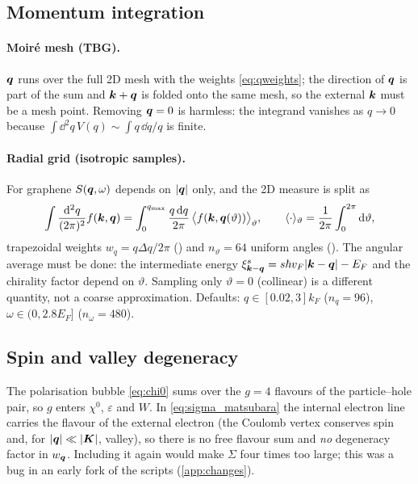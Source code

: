 \subsection{Momentum integration}
\label{sec:radial}

\paragraph{Moir\'e mesh (TBG).} $\bm q$ runs over the full 2D mesh with the weights \eqref{eq:qweights}; the
direction of $\bm q$ is part of the sum and $\bm k+\bm q$ is folded onto the same mesh, so the external $\bm k$ must be a
mesh point. Removing $\bm q=0$ is harmless: the integrand vanishes as $q\to0$ because
$\int\dd^2q\,V(q)\sim\int q\,\dd q/q$ is finite.

\paragraph{Radial grid (isotropic samples).} For graphene $S(\bm q,\omega)$ depends on $|\bm q|$ only, and the 2D
measure is split as
\begin{equation}
\int\frac{\mathrm d^2q}{(2\pi)^2}f(\bm k,\bm q)=\int_0^{q_{\max}}\frac{q\,\mathrm d q}{2\pi}\,\bigl\langle f(\bm k,\bm q(\vartheta))\bigr\rangle_\vartheta,
\qquad\langle\cdot\rangle_\vartheta=\frac1{2\pi}\int_0^{2\pi}\mathrm d\vartheta ,
\label{eq:radial}
\end{equation}
trapezoidal weights $w_q=q\Delta q/2\pi$ () and $n_\vartheta=64$ uniform angles
(). The angular average must be done: the intermediate energy
$\xi^s_{\bm k-\bm q}=s\hbar v_F|\bm k-\bm q|-E_F$ and the chirality factor depend on $\vartheta$. Sampling only
$\vartheta=0$ (collinear) is a different quantity, not a coarse approximation. Defaults: $q\in[0.02,3]k_F$
($n_q=96$), $\omega\in(0,2.8E_F]$ ($n_\omega=480$).

\subsection{Spin and valley degeneracy}
\label{sec:degeneracy}

The polarisation bubble \eqref{eq:chi0} sums over the $g=4$ flavours of the particle--hole pair, so $g$ enters
$\chi^0$, $\varepsilon$ and $W$. In \cref{eq:sigma_matsubara} the internal electron line carries the flavour of
the external electron (the Coulomb vertex conserves spin and, for $|\bm q|\ll|\bm K|$, valley), so there is no free
flavour sum and \emph{no} degeneracy factor in $w_{\bm q}$. Including it again would make $\Sigma$ four times too
large; this was a bug in an early fork of the scripts (\cref{app:changes}).

